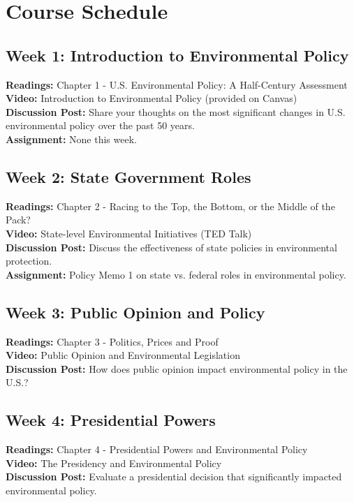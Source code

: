 \documentclass[12pt, letterpaper]{article}
\begin{document}
\section*{Course Schedule}

\subsection*{Week 1: Introduction to Environmental Policy}
\textbf{Readings:} Chapter 1 - U.S. Environmental Policy: A Half-Century Assessment\\
\textbf{Video:} Introduction to Environmental Policy (provided on Canvas)\\
\textbf{Discussion Post:} Share your thoughts on the most significant changes in U.S. environmental policy over the past 50 years.\\
\textbf{Assignment:} None this week.

\subsection*{Week 2: State Government Roles}
\textbf{Readings:} Chapter 2 - Racing to the Top, the Bottom, or the Middle of the Pack?\\
\textbf{Video:} State-level Environmental Initiatives (TED Talk)\\
\textbf{Discussion Post:} Discuss the effectiveness of state policies in environmental protection.\\
\textbf{Assignment:} Policy Memo 1 on state vs. federal roles in environmental policy.

\subsection*{Week 3: Public Opinion and Policy}
\textbf{Readings:} Chapter 3 - Politics, Prices and Proof\\
\textbf{Video:} Public Opinion and Environmental Legislation\\
\textbf{Discussion Post:} How does public opinion impact environmental policy in the U.S.?

\subsection*{Week 4: Presidential Powers}
\textbf{Readings:} Chapter 4 - Presidential Powers and Environmental Policy\\
\textbf{Video:} The Presidency and Environmental Policy\\
\textbf{Discussion Post:} Evaluate a presidential decision that significantly impacted environmental policy.
\end{document}

